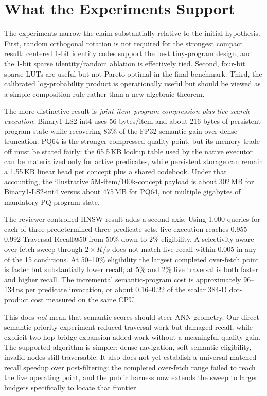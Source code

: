 \section{What the Experiments Support}
The experiments narrow the claim substantially relative to the initial \rsa hypothesis. First, random orthogonal rotation is not required for the strongest compact result: centered 1-bit identity codes support the best tiny-program design, and the 1-bit sparse identity/random ablation is effectively tied. Second, four-bit sparse LUTs are useful but not Pareto-optimal in the final benchmark. Third, the calibrated log-probability product is operationally useful but should be viewed as a simple composition rule rather than a new algebraic theorem.

The more distinctive result is \emph{joint item--program compression plus live search execution}. Binary1-LS2-int4 uses 56 bytes/item and about 216 bytes of persistent program state while recovering 83\% of the FP32 semantic gain over dense truncation. PQ64 is the stronger compressed quality point, but its memory trade-off must be stated fairly: the 65.5\,KB lookup table used by the native executor can be materialized only for active predicates, while persistent storage can remain a 1.55\,KB linear head per concept plus a shared codebook. Under that accounting, the illustrative 5M-item/100k-concept payload is about 302\,MB for Binary1-LS2-int4 versus about 475\,MB for PQ64, not multiple gigabytes of mandatory PQ program state.

The reviewer-controlled HNSW result adds a second axis. Using 1,000 queries for each of three predetermined three-predicate sets, live execution reaches 0.955--0.992 Traversal Recall@50 from 50\% down to 2\% eligibility. A selectivity-aware over-fetch sweep through $2\times K/s$ does not match live recall within 0.005 in any of the 15 conditions. At 50--10\% eligibility the largest completed over-fetch point is faster but substantially lower recall; at 5\% and 2\% live traversal is both faster and higher recall. The incremental semantic-program cost is approximately 96--134\,ns per predicate invocation, or about 0.16--0.22 of the scalar 384-D dot-product cost measured on the same CPU.

This does \emph{not} mean that semantic scores should steer ANN geometry. Our direct semantic-priority experiment reduced traversal work but damaged recall, while explicit two-hop bridge expansion added work without a meaningful quality gain. The supported algorithm is simpler: dense navigation, soft semantic eligibility, invalid nodes still traversable. It also does not yet establish a universal matched-recall speedup over post-filtering: the completed over-fetch range failed to reach the live operating point, and the public harness now extends the sweep to larger budgets specifically to locate that frontier.

